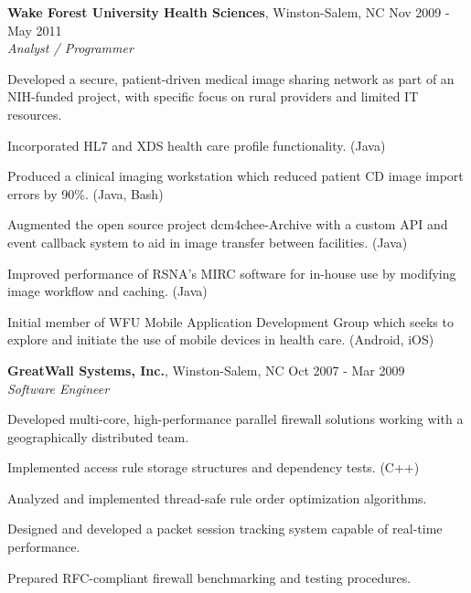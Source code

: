 \documentclass[margin,line]{resume}
\begin{document}
\begin{resume}
  \textbf{Wake Forest University Health Sciences}, Winston-Salem, NC \hfill Nov 2009 - May 2011\vspace{1mm}\\
  \textsl{Analyst / Programmer}\\
  \vspace{-3mm}
  \begin{list2}
  \item Developed a secure, patient-driven medical image sharing
    network as part of an NIH-funded project, with specific focus on
    rural providers and limited IT resources.
  \item Incorporated HL7 and XDS health care profile
    functionality. (Java)
  \item Produced a clinical imaging workstation which reduced patient
    CD image import errors by 90\%. (Java, Bash)
  \item Augmented the open source project dcm4chee-Archive with a
    custom API and event callback system to aid in image transfer
    between facilities. (Java)
  \item Improved performance of RSNA's MIRC software for in-house use
    by modifying image workflow and caching. (Java)
  \item Initial member of WFU Mobile Application Development Group
    which seeks to explore and initiate the use of mobile devices in
    health care. (Android, iOS)
  \end{list2}

  \textbf{GreatWall Systems, Inc.}, Winston-Salem, NC \hfill Oct 2007 - Mar 2009\vspace{1mm}\\
  \textsl{Software Engineer}\\
  \vspace{-3mm}
  \begin{list2}
  \item Developed multi-core, high-performance parallel firewall
    solutions working with a geographically distributed team.
  \item Implemented access rule storage structures and dependency
    tests. (C++)
  \item Analyzed and implemented thread-safe rule order optimization
    algorithms.
  \item Designed and developed a packet session tracking system
    capable of real-time performance.
  \item Prepared RFC-compliant firewall benchmarking and testing
    procedures.
  \end{list2}


\end{resume}
\end{document}
